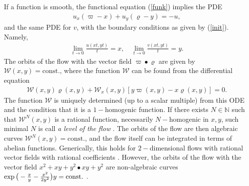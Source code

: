 \documentclass[reqno,12pt]{amsart}
\begin{document}
If a function is smooth, the functional equation (\ref{funk}) implies the PDE \cite{alkauskas}
\begin{eqnarray}
u_{x}(\varpi-x)+u_{y}(\varrho-y)=-u,\label{pde}
\end{eqnarray}
and the same PDE for $v$, with the boundary conditions as given by (\ref{init}). Namely,
\begin{eqnarray*}
\lim\limits_{t\rightarrow 0}\frac{u(xt,yt)}{t}=x,\quad 
\lim\limits_{t\rightarrow 0}\frac{v(xt,yt)}{t}=y.
\end{eqnarray*}
The orbits of the flow with the vector field $\varpi{\bullet}\varrho$ are given by $\mathscr{W}(x,y)=\mathrm{const}.$, where the function $\mathscr{W}$ can be found from the differential equation
\begin{eqnarray}
\mathscr{W}(x,y)\varrho(x,y)+\mathscr{W}_{x}(x,y)[y\varpi(x,y)-x\varrho(x,y)]=0.
\label{orbits}
\end{eqnarray}
The function $\mathscr{W}$ is uniquely determined (up to a scalar multiple) from this ODE and the condition that it is a $1-$homogenic function. If there exists $N\in\mathbb{N}$ such that $\mathscr{W}^{N}(x,y)$ is a rational function, necessarily $N-$homogenic in $x,y$, such minimal $N$ is call \emph{a level of the flow} \cite{alkauskas}. The orbits of the flow are then algebraic curves $\mathscr{W}^{N}(x,y)=\mathrm{const}.$, and the flow itself can be integrated in terms of abelian functions. Generically, this holds for $2-$dimensional flows with rational vector fields with rational coefficients \cite{alkauskas-ab}. However, the orbits of the flow with the vector field $x^2+xy+y^2{\bullet} xy+y^2$ are non-algebraic curves $\exp\big{(}-\frac{x}{y}-\frac{x^2}{2y^2}\big{)}y=\mathrm{const.}$  \cite{alkauskas-ab}.
 
\end{document}
